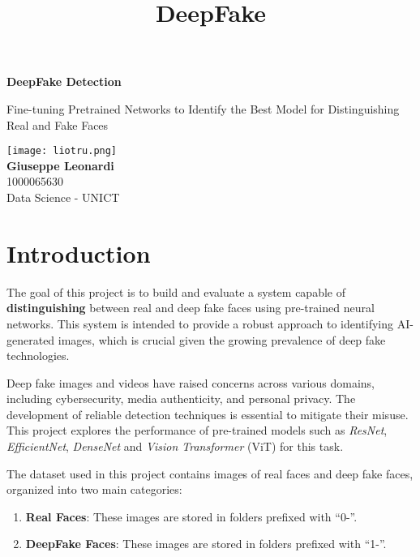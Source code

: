 \documentclass[12pt]{article}
\title{DeepFake}
\begin{document}
\begin{titlepage}
    \centering
  
    {\Huge\bfseries DeepFake Detection \\[1cm]} 
 
    {\Huge Fine-tuning Pretrained Networks to Identify the Best Model for Distinguishing Real and Fake Faces \\[2cm]} 
    
    \texttt{[image: liotru.png]} \\[1cm] 
    
 
    {\huge\textbf{Giuseppe Leonardi}} \\[0.5cm]
    {\Large 1000065630} \\[0.5cm]
    {\Large Data Science - UNICT} \\[1.5cm] 
    
    
    \vfill
\end{titlepage}


    \tableofcontents
    \newpage
\section{Introduction}\label{introduction}

    The goal of this project is to build and evaluate a system capable of
\textbf{distinguishing} between real and deep fake faces using
pre-trained neural networks. This system is intended to provide a robust
approach to identifying AI-generated images, which is crucial given the
growing prevalence of deep fake technologies.

Deep fake images and videos have raised concerns across various domains,
including cybersecurity, media authenticity, and personal privacy. The
development of reliable detection techniques is essential to mitigate
their misuse. This project explores the performance of pre-trained
models such as \emph{ResNet}, \emph{EfficientNet}, \emph{DenseNet} and
\emph{Vision Transformer} (ViT) for this task.

The dataset used in this project contains images of real faces and deep
fake faces, organized into two main categories:

\begin{enumerate}
\def\labelenumi{\arabic{enumi}.}
\item
  \textbf{Real Faces}: These images are stored in folders prefixed with
  ``0-''.
\item
  \textbf{DeepFake Faces}: These images are stored in folders prefixed
  with ``1-''.
\end{enumerate}
\end{document}
